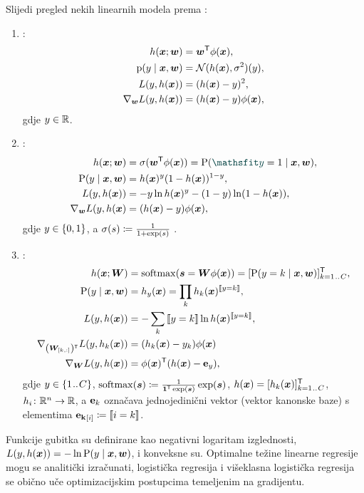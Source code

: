 \documentclass[utf8, diplomski, lmodern]{fer}
\begin{document}
Slijedi pregled nekih linearnih modela prema \citet{Snajder:2017:SULR2}:
\begin{enumerate}
\item {}:
\begin{align*}
h(\vec x;\vec w) &= \vec w^\tp\phi(\vec x), \\
\p(y\mid\vec x,\vec w) &= \mathcal{N}(h(\vec x),\sigma^2)(y), \\
L(y, h(\vec x)) &= \del{h(\vec x)-y}^2, \\
\nabla_{\vec w}L(y, h(\vec x)) &= \del{h(\vec x)-y}\phi(\vec x),
\end{align*}
gdje $y\in\mathbb{R}$.
\item {}:
\begin{align*}
h(\vec x;\vec w) &= \sigma(\vec w^\tp\phi(\vec x)) = \P(\rvar y=1\mid\vec x,\vec w), \\
\P(y\mid\vec x,\vec w) &= h(\vec x)^y(1-h(\vec x))^{1-y}, \\
L(y, h(\vec x)) &= -y\ln h(\vec x)^y-(1-y)\ln(1-h(\vec x)), \\
\nabla_{\vec w}L(y, h(\vec x) &= \del{h(\vec x)-y}\phi(\vec x),
\end{align*}
gdje $y\in\cbr{0,1}$, a $\sigma(s)\coloneqq\frac{1}{1+\exp\del{s}}$ .
\item {}:
\begin{align*}
h(\vec x;\vec W) &= \softmax(\vec s=\vec W\phi(\vec x)) = \sbr{\P(y=k\mid\vec x,\vec w)}_{k=1\bidot C}^\tp, \\
\P(y\mid\vec x,\vec w) &= h_y(\vec x) = \prod_k h_k(\vec x)^\enbbracket{y=k}, \\
L(y, h(\vec x)) &= -\sum_k \enbbracket{y=k}\ln h(\vec x)^\enbbracket{y=k}, \\
\nabla_{\del{\vec W_\ind{k,:}}^\tp}L(y, h_k(\vec x)) &= \del{h_k(\vec x)-y_k}\phi(\vec x) \\
\nabla_{\vec W}L(y, h(\vec x)) &= \phi(\vec x)^\tp \del{h(\vec x)-\cvec e_y} \text{,}
\end{align*}
gdje $y\in\cbr{1\bidot C}$, $\softmax(\vec s)\coloneqq\frac{1}{\cvec 1^\tp\exp(\vec s)}\exp(\vec s)$, $h(\vec x)=\sbr{h_k(\vec x)}_{k=1\bidot C}^\tp$, $h_i \colon \mathbb{R}^n \to \mathbb{R}$, a $\mathbf{e}_k$ označava jednojedinični vektor (vektor kanonske baze) s elementima $\cvec {e_k}_\ind{i}\coloneqq\enbbracket{i=k}$.
\end{enumerate}
Funkcije gubitka su definirane kao negativni logaritam izglednosti, $L(y, h(\vec x))=-\ln\P(y\mid\vec x,\vec w)$, i konveksne su. Optimalne težine linearne regresije mogu se analitički izračunati, logistička regresija i višeklasna logistička regresija se obično uče optimizacijskim postupcima temeljenim na gradijentu.
\end{document}
